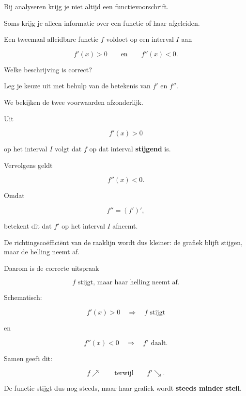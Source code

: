 \documentclass{ximera}
\begin{document}

Bij analyseren krijg je niet altijd een functievoorschrift.

Soms krijg je alleen informatie over een functie of haar afgeleiden.

\begin{oefening}{\oefU\ESS}

Een tweemaal afleidbare functie $f$ voldoet op een interval $I$ aan

\[
f'(x)>0
\qquad\text{en}\qquad
f''(x)<0.
\]

Welke beschrijving is correct?

\begin{multipleChoice}
\end{multipleChoice}

Leg je keuze uit met behulp van de betekenis van $f'$ en $f''$.
\begin{oplossing}

  We bekijken de twee voorwaarden afzonderlijk.
  
  Uit
  
  \[
  f'(x)>0
  \]
  
  op het interval $I$ volgt dat $f$ op dat interval
  \textbf{stijgend} is.
  
  Vervolgens geldt
  
  \[
  f''(x)<0.
  \]
  
  Omdat
  
  \[
  f''=(f')',
  \]
  
  betekent dit dat $f'$ op het interval $I$ afneemt.
  
  De richtingscoëfficiënt van de raaklijn wordt dus kleiner:
  de grafiek blijft stijgen, maar de helling neemt af.
  
  Daarom is de correcte uitspraak
  
  \[
  \boxed{
  \text{$f$ stijgt, maar haar helling neemt af.}
  }
  \]
  
  Schematisch:
  
  \[
  \boxed{
  f'(x)>0
  \quad\Longrightarrow\quad
  f\text{ stijgt}
  }
  \]
  
  en
  
  \[
  \boxed{
  f''(x)<0
  \quad\Longrightarrow\quad
  f'\text{ daalt}.
  }
  \]
  
  Samen geeft dit:
  
  \[
  \boxed{
  f\nearrow
  \qquad\text{terwijl}\qquad
  f'\searrow.
  }
  \]
  
  De functie stijgt dus nog steeds, maar haar grafiek wordt
  \textbf{steeds minder steil}.
  
  \end{oplossing}

\end{oefening}
\end{document}
